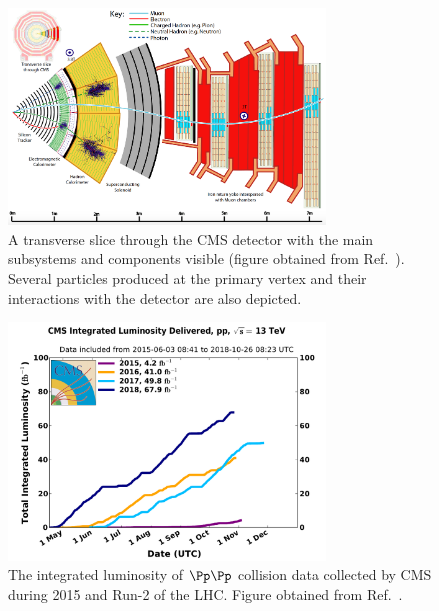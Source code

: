 \begin{figure}[htbp]
    \centering
    \includegraphics[width=0.75\textwidth]{figures/Transverse_slice_CMS.png}
    \caption[A transverse slice through the CMS detector with the main subsystems and components visible]{A transverse slice through the CMS detector with the main subsystems and components visible (figure obtained from Ref.~). Several particles produced at the primary vertex and their interactions with the detector are also depicted.}
    \label{fig:detector_cms_transverse}
\end{figure}

\begin{figure}[htbp]
    \centering
    \includegraphics[width=0.75\textwidth]{figures/int_lumi_cumulative_pp_2_run2.pdf}
    \caption[The integrated luminosity of $\Pp\Pp$ collision data delivered to CMS during 2015 and Run-2 of the LHC]{The integrated luminosity of $\Pp\Pp$ collision data collected by CMS during 2015 and Run-2 of the LHC. Figure obtained from Ref.~.}
    \label{fig:detector_cms_lumi}
\end{figure}

